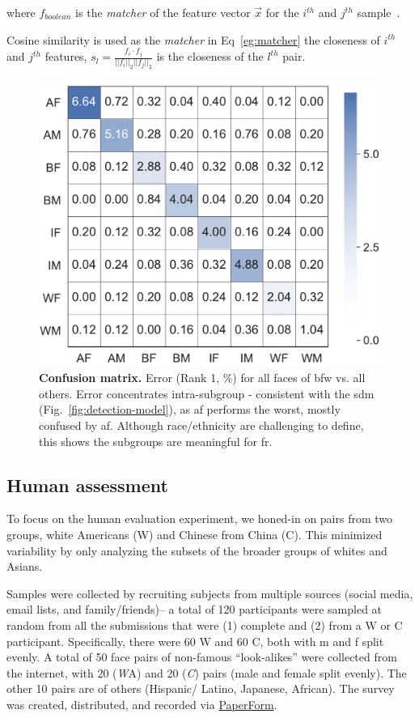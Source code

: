 where $f_{boolean}$ is the \textit{matcher} of the feature vector $\vec{x}$ for the $i^{th}$ and $j^{th}$ sample~\cite{LFWTech}.

Cosine similarity is used as the \emph{matcher} in Eq~\ref{eg:matcher} the closeness of $i^{th}$ and $j^{th}$ features, \ie
$
s_l= \frac{f_i\cdot f_j}{||f_i||_2||f_j||_2}
$ is the closeness of the $l^{th}$ pair. 

\begin{figure}[t!]
	\centering    
	\includegraphics[width=.75\linewidth]{figures/confusion.pdf}
		\caption{\small{\textbf{Confusion matrix.} Error (Rank 1, \%) for all faces of \gls{bfw} vs. all others. Error concentrates intra-subgroup - consistent with the \gls{sdm} (Fig.~\ref{fig:detection-model}), as \gls{af} performs the worst, mostly confused by \gls{af}. Although race/ethnicity are challenging to define, this shows the subgroups are meaningful for \gls{fr}.}}
		\label{fig:confusion} 
		    \vspace{-6mm}
\end{figure} 

\subsection{Human assessment}\label{subsec:human-assessment}
To focus on the human evaluation experiment, we honed-in on pairs from two groups, white Americans (W) and Chinese from China (C). This minimized variability by only analyzing the subsets of the broader groups of whites and Asians. %

Samples were collected by recruiting subjects from multiple sources (\eg social media, email lists, and family/friends)-- a total of 120 participants were sampled at random from all the submissions that were (1) complete and (2) from a W or C participant. Specifically, there were 60 W and 60 C, both with \gls{m} and \gls{f} split evenly. A total of 50 face pairs of non-famous ``look-alikes'' were collected from the internet, with 20 ({\emph WA}) and 20 ({\emph C}) pairs (male and female split evenly). The other 10 pairs are of others (\eg Hispanic/ Latino, Japanese, African). The survey was created, distributed, and recorded via \href{https://paperform.co}{PaperForm}. 
